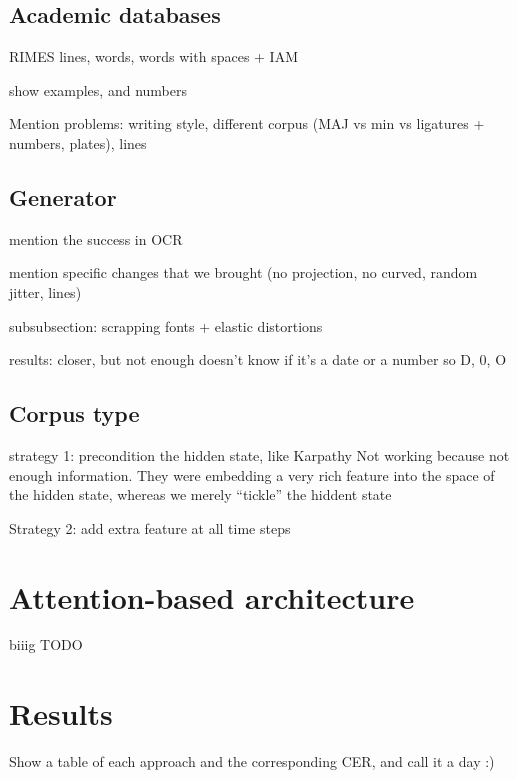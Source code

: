 
	\subsection{Academic databases}
		RIMES lines, words, words with spaces + IAM

		show examples, and numbers

		Mention problems: writing style, different corpus (MAJ vs min vs ligatures + numbers, plates), lines


	\subsection{Generator}

		mention the success in OCR

		mention specific changes that we brought (no projection, no curved, random jitter, lines)

		subsubsection: scrapping fonts + elastic distortions

		results:  closer, but not enough doesn't know if it's a date or a number so D, 0, O


	\subsection{Corpus type}
		strategy 1: precondition the hidden state, like Karpathy
		Not working because not enough information. They were embedding a very rich feature into the space of the hidden state, whereas we merely ``tickle'' the hiddent state

		Strategy 2: add extra feature at all time steps


\section{Attention-based architecture}\label{sec:attention}
	biiig TODO


\section{Results}\label{sec:transcription_results}

		Show a table of each approach and the corresponding CER, and call it a day :)

\stopToDo{}

